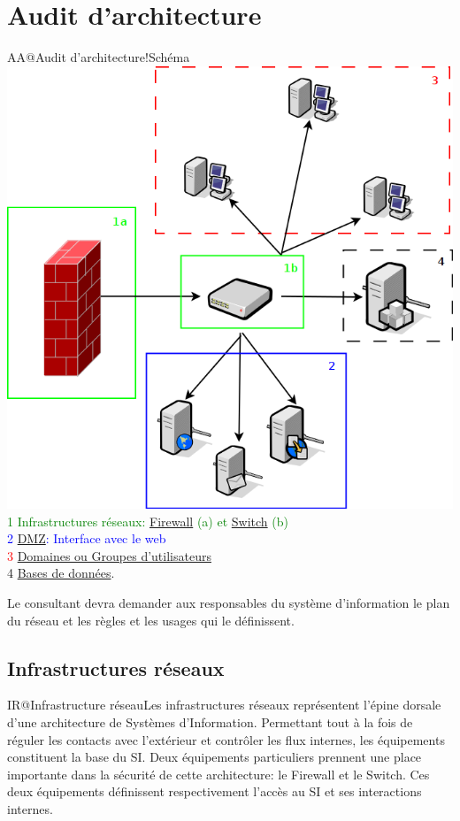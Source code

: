 \documentclass[twoside,a4paper,12pt,titlepage]{book}
\begin{document}
\chapter{Audit d'architecture}
\begin{Define}{AA@Audit d'architecture!Schéma}
	\includegraphics[width=\textwidth]{auditarchi.png}
	\tcblower
	\textcolor{Green}{1 Infrastructures réseaux: \hyperref[Firewall]{Firewall} (a) et \hyperref[Switch]{Switch} (b)}\\
	\textcolor{blue}{2 \hyperref[DMZ]{\gls{DMZ}}: Interface avec le web}\\
	\textcolor{red}{3 \hyperref[UserJumbo]{Domaines ou Groupes d'utilisateurs}}\\
	4 \hyperref[ArchiDatabase]{Bases de données}.\\
\end{Define}
\begin{Pre}
	Le consultant devra demander aux responsables du système d'information le plan du réseau et les règles et les usages qui le définissent.
\end{Pre}
\section{Infrastructures réseaux}
\begin{Define}{IR@Infrastructure réseau}Les infrastructures réseaux représentent l'épine dorsale d'une architecture de Systèmes d'Information. Permettant tout à la fois de réguler les contacts avec l'extérieur et contrôler les flux internes, les équipements constituent la base du SI. Deux équipements particuliers prennent une place importante dans la sécurité de cette architecture: le Firewall et le Switch. Ces deux équipements définissent respectivement l'accès au SI et ses interactions internes.\end{Define}
\end{document}
